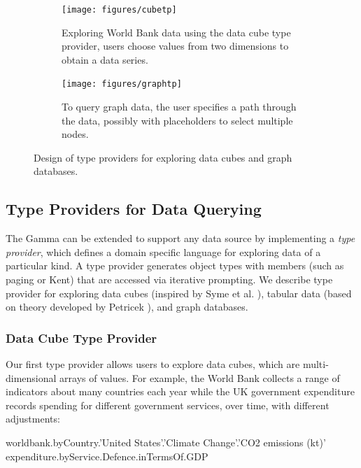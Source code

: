 \documentclass[manuscript,review,anonymous]{acmart}
\newcommand{\ikvd}[1]{{\fontfamily{zi4}\selectfont\small #1}}
\begin{document}
\begin{figure}
\centering
\begin{subfigure}[b]{0.5\textwidth}
  \centering
  \texttt{[image: figures/cubetp]}
  \vspace{0.5em}
  \caption{Exploring World Bank data using the data cube type provider, users
    choose values from two dimensions to obtain a data series.}
  \label{fig:cubetp}
\end{subfigure}
\hfill
\begin{subfigure}[b]{0.45\textwidth}
  \centering
  \texttt{[image: figures/graphtp]}
  \caption{To query graph data, the user specifies a path through the data, possibly with
    placeholders to select multiple nodes.}
  \label{fig:graphtp}
\end{subfigure}
\vspace{-0.5em}
\caption{Design of type providers for exploring data cubes and graph databases.}
\label{fig:tps}
\end{figure}

\subsection{Type Providers for Data Querying}
\label{sec:overview-tps}

The Gamma can be extended to support any data source by implementing a \emph{type provider},
which defines a domain specific language for exploring data of a particular kind.
A type provider generates object types with members (such as \ikvd{paging} or \ikvd{Kent})
that are accessed via iterative prompting. We describe type provider for exploring data cubes
(inspired by Syme et al. \cite{inforich}), tabular data (based on theory developed
by Petricek \cite{dotdriven}), and graph databases.

\subsubsection*{Data Cube Type Provider}
Our first type provider allows users to explore data cubes, which are multi-dimensional
arrays of values. For example, the World Bank collects a range of indicators about many countries
each year while the UK government expenditure records spending for different government services,
over time, with different adjustments:

\begin{thegamma}
worldbank.byCountry.'United States'.'Climate Change'.'CO2 emissions (kt)'
expenditure.byService.Defence.inTermsOf.GDP
\end{thegamma}
\end{document}

